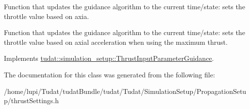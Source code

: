 Function that updates the guidance algorithm to the current time/state\+: sets the throttle value based on axia. 

Function that updates the guidance algorithm to the current time/state\+: sets the throttle value based on axial acceleration when using the maximum thrust. 

Implements \hyperlink{classtudat_1_1simulation__setup_1_1ThrustInputParameterGuidance_ae929c1969241aea9408a5ac20c2f5216}{tudat\+::simulation\+\_\+setup\+::\+Thrust\+Input\+Parameter\+Guidance}.



The documentation for this class was generated from the following file\+:\begin{DoxyCompactItemize}
\item 
/home/lupi/\+Tudat/tudat\+Bundle/tudat/\+Tudat/\+Simulation\+Setup/\+Propagation\+Setup/thrust\+Settings.\+h\end{DoxyCompactItemize}

